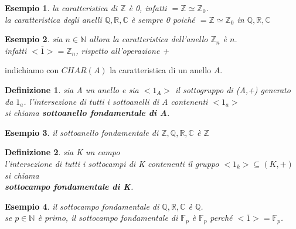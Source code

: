 \documentclass[a4paper,12pt]{article}
\theoremstyle{def}
\newtheorem*{definition}{Definizione}
\theoremstyle{prop}
\theoremstyle{esempio}
\newtheorem*{example}{Esempio}
\theoremstyle{dimostrazione}
\theoremstyle{teo}
\theoremstyle{osservazione}
\begin{document}
\begin{example}
    la caratteristica di \(\mathbb{Z}\) è 0, infatti \(<1> = \mathbb{Z} \simeq \mathbb{Z}_0\).\\
    la caratteristica degli anelli \(\mathbb{Q},\mathbb{R},\mathbb{C}\) è sempre 0 poiché \(<1> = \mathbb{Z} \simeq \mathbb{Z}_0\) in  \(\mathbb{Q},\mathbb{R},\mathbb{C}\)\\
\end{example}

\begin{example}
    sia \(n \in \mathbb{N}\) allora la caratteristica dell'anello \(\mathbb{Z}_n\) è \(n\).\\
    infatti \(<\overline{1}> = \mathbb{Z}_n\), rispetto all'operazione +\\
\end{example}

indichiamo con \(CHAR(A)\) la caratteristica di un anello \(A\).\\
\begin{definition}
    sia A un anello e sia \(<1_A>\) il sottogruppo di (A,+) generato da \(1_a\).
    l'intersezione di tutti i sottoanelli di A contenenti \(<1_a>\)\\
    si chiama \textbf{sottoanello fondamentale di A}.\\
\end{definition}

\begin{example}
    il sottoanello fondamentale di \(\mathbb{Z},\mathbb{Q},\mathbb{R},\mathbb{C}\) è \(\mathbb{Z}\)
\end{example}

\begin{definition}
    sia K un campo\\
    l'intersezione di tutti i sottocampi di K contenenti il gruppo \(<1_k> \subseteq (K,+)\) si chiama \\
    \textbf{sottocampo fondamentale di K}.\\
\end{definition}

\begin{example}
    il sottocampo fondamentale di \(\mathbb{Q},\mathbb{R},\mathbb{C}\) è \(\mathbb{Q}\).\\
    se \(p \in \mathbb{N}\) è primo, il sottocampo fondamentale di \(\mathbb{F}_p\) è \(\mathbb{F}_p\) perché \(<\overline{1}> = \mathbb{F}_p\).\\
\end{example}
\end{document}
